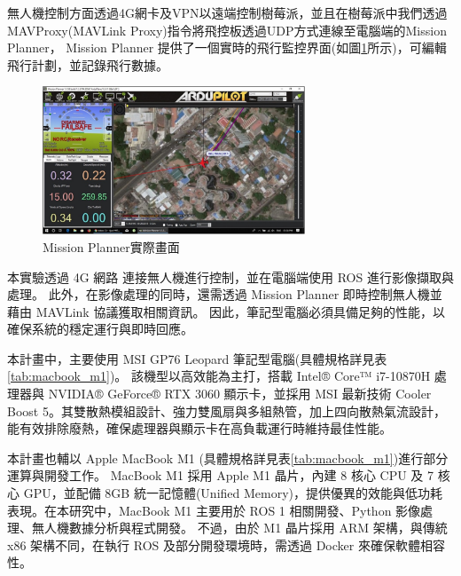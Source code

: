 \documentclass[12pt]{article}       %
\begin{document}
無人機控制方面透過4G網卡及VPN以遠端控制樹莓派，並且在樹莓派中我們透過MAVProxy(MAVLink Proxy)\cite{mavproxy_2023}指令將飛控板透過UDP方式連線至電腦端的Mission Planner\cite{pixhawk_2023}，
Mission Planner 提供了一個實時的飛行監控界面(如圖\ref{fig:missionplanner}所示)，可編輯飛行計劃，並記錄飛行數據。
\begin{figure}[H]
    \centering
    \includegraphics[width=0.7\textwidth]{missionplanner.jpg}     %
    \caption{Mission Planner實際畫面\cite{pixhawk_2023}}    %
    \label{fig:missionplanner}    %
\end{figure}
本實驗透過 4G 網路 連接無人機進行控制，並在電腦端使用 ROS 進行影像擷取與處理。
此外，在影像處理的同時，還需透過 Mission Planner 即時控制無人機並藉由 MAVLink 協議獲取相關資訊。
因此，筆記型電腦必須具備足夠的性能，以確保系統的穩定運行與即時回應。

本計畫中，主要使用 MSI GP76 Leopard 筆記型電腦(具體規格詳見表\ref{tab:macbook_m1})。
該機型以高效能為主打，搭載 Intel® Core™ i7-10870H 處理器與 NVIDIA® GeForce® RTX 3060 顯示卡，並採用 MSI 最新技術 Cooler Boost 5。其雙散熱模組設計、強力雙風扇與多組熱管，加上四向散熱氣流設計，能有效排除廢熱，確保處理器與顯示卡在高負載運行時維持最佳性能。

本計畫也輔以 Apple MacBook M1 (具體規格詳見表\ref{tab:macbook_m1})進行部分運算與開發工作。
MacBook M1 採用 Apple M1 晶片，內建 8 核心 CPU 及 7 核心 GPU，並配備 8GB 統一記憶體(Unified Memory)，提供優異的效能與低功耗表現。在本研究中，MacBook M1 主要用於 ROS 1 相關開發、Python 影像處理、無人機數據分析與程式開發。
不過，由於 M1 晶片採用 ARM 架構，與傳統 x86 架構不同，在執行 ROS 及部分開發環境時，需透過 Docker 來確保軟體相容性。
\end{document}
